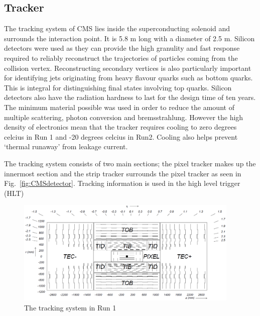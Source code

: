 \subsection{Tracker \label{sec:tracker}}

The tracking system of CMS lies inside the superconducting solenoid and surrounds the interaction point. It is 5.8 m long with a diameter of 2.5 m.
Silicon detectors were used as they can provide the high granulity and fast response required to reliably reconstruct the trajectories of particles coming from the collision vertex.
Reconstructing secondary vertices is also particularly important for identifying jets originating from heavy flavour quarks such as bottom quarks. This is integral for distinguishing final states involving top quarks. Silicon detectors also have the radiation hardness to last for the design time of ten years. The minimum material possible was used in order to reduce the amount of multiple scattering, photon conversion and bremsstrahlung. However the high density of electronics mean that the tracker requires cooling to zero degrees celcius in Run 1 and -20 degrees celcius in Run2. Cooling also helps prevent `thermal runaway' from leakage current. 

The tracking system consists of two main sections; the pixel tracker makes up the innermost section and the strip tracker surrounds the pixel tracker as seen in Fig.~\ref{fig:CMSdetector}. Tracking information is used in the high level trigger (HLT)


\begin{figure}[ht!]
\centering
    \includegraphics[width=0.95\textwidth]{images/TrackerWhole.png}
    \caption{The tracking system in Run 1~\cite{1748-0221-3-08-S08004}}
    \label{fig:TrackerWhole}
\end{figure}

